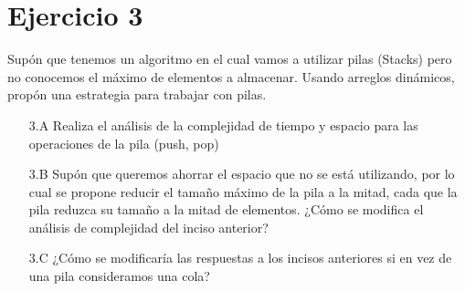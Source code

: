 \documentclass[12pt]{article}
\begin{document}
\section*{Ejercicio 3}
Supón que tenemos un algoritmo en el cual vamos a utilizar pilas (Stacks) pero no conocemos el máximo de elementos a almacenar. Usando arreglos dinámicos, propón una estrategia para trabajar con pilas.
\begin{itemize}
    \item[3.A] Realiza el análisis de la complejidad de tiempo y espacio para las operaciones de la pila (push, pop)
    \item[3.B] Supón que queremos ahorrar el espacio que no se está utilizando, por lo cual se propone reducir el tamaño máximo de la pila a la mitad, cada que la pila reduzca su tamaño a la mitad de elementos. ¿Cómo se modifica el análisis de complejidad del inciso anterior?
    \item[3.C] ¿Cómo se modificaría las respuestas a los incisos anteriores si en vez de una pila consideramos una cola?
\end{itemize}
\end{document}
